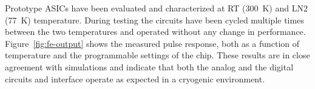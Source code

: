 Prototype ASICs have been evaluated and characterized at RT (300~K) and LN2 (77~K) temperature.
During testing the circuits have been cycled multiple times
between the two temperatures and operated without any change in performance.
Figure~\ref{fig:fe-output} shows the measured pulse response, both as a function
of temperature and the programmable settings of the chip.
These results are in close agreement with simulations and indicate
that both the analog and the digital circuits and interface operate as
expected in a cryogenic environment.
